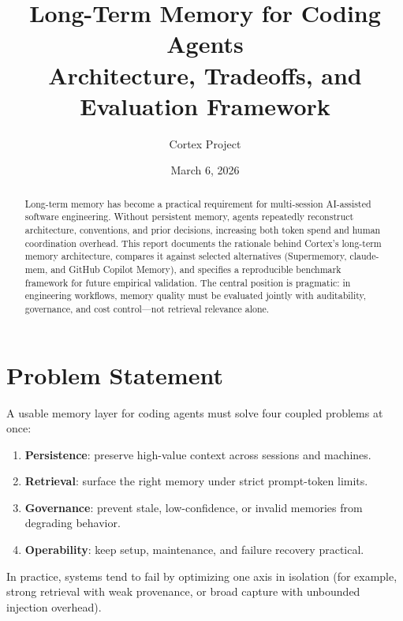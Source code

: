 \documentclass[11pt]{article}
\title{Long-Term Memory for Coding Agents\\\large Architecture, Tradeoffs, and Evaluation Framework}
\author{Cortex Project}
\date{March 6, 2026}
\begin{document}
\maketitle

\begin{abstract}
Long-term memory has become a practical requirement for multi-session AI-assisted software engineering. Without persistent memory, agents repeatedly reconstruct architecture, conventions, and prior decisions, increasing both token spend and human coordination overhead. This report documents the rationale behind Cortex's long-term memory architecture, compares it against selected alternatives (Supermemory, claude-mem, and GitHub Copilot Memory), and specifies a reproducible benchmark framework for future empirical validation. The central position is pragmatic: in engineering workflows, memory quality must be evaluated jointly with auditability, governance, and cost control---not retrieval relevance alone.
\end{abstract}

\section{Problem Statement}
A usable memory layer for coding agents must solve four coupled problems at once:
\begin{enumerate}
  \item \textbf{Persistence}: preserve high-value context across sessions and machines.
  \item \textbf{Retrieval}: surface the right memory under strict prompt-token limits.
  \item \textbf{Governance}: prevent stale, low-confidence, or invalid memories from degrading behavior.
  \item \textbf{Operability}: keep setup, maintenance, and failure recovery practical.
\end{enumerate}

In practice, systems tend to fail by optimizing one axis in isolation (for example, strong retrieval with weak provenance, or broad capture with unbounded injection overhead).
\end{document}
